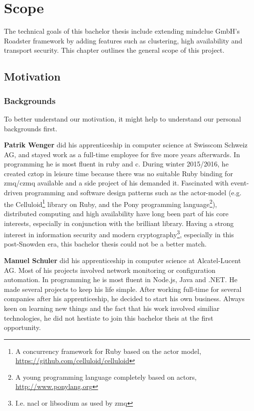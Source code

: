 \chapter{Scope}
The technical goals of this bachelor thesis include extending mindclue GmbH's
Roadster framework by adding features such as clustering, high availability and
transport security. This chapter outlines the general scope of this project.

\section{Motivation}
\subsection{Backgrounds}
To better understand our motivation, it might help to understand our personal
backgrounds first.

\textbf{Patrik Wenger} did his apprenticeship in computer science at Swisscom
Schweiz AG, and stayed work as a full-time employee for five more years
afterwards. In programming he is most fluent in \gls{ruby} and \gls{c}. During
winter 2015/2016, he created \gls{cztop} in leisure time because
there was no suitable Ruby binding for \gls{zmq}/\gls{czmq} available and a side
project of his demanded it. Fascinated with event-driven programming and
software design patterns such as the \gls{actor-model} (e.g. the
Celluloid\footnote{A concurrency framework for Ruby based on the actor model,
\url{https://github.com/celluloid/celluloid}} library on Ruby,
and the Pony programming language\footnote{A young programming language completely based on actors,
\url{http://www.ponylang.org}}), distributed computing and high availability
have long been part of his core interests, especially in conjunction with the
brilliant \zmq library. Having a strong interest in information security and modern
cryptography\footnote{I.e. \gls{nacl} or \gls{libsodium} as used by
\gls{zmq}}, especially in this post-Snowden era, this bachelor thesis could not
be a better match.

\textbf{Manuel Schuler} did his apprenticeship in computer science at
Alcatel-Lucent AG.  Most of his projects involved network monitoring or
configuration automation. In programming he is most fluent in Node.js, Java and .NET. He
made several projects to keep his life simple. After working full-time for
several companies after his apprenticeship, he decided to start his own
business.  Always keen on learning new things and the fact that his work
involved similiar technologies, he did not hestiate to join this bachelor theis
at the first opportunity.

